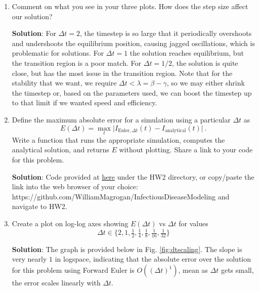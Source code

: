 \documentclass[11pt]{article}
\begin{document}
\begin{enumerate}
\begin{enumerate}[label=\alph*.]
	\item Comment on what you see in your three plots. How does the step size affect our solution?
	\begin{tcolorbox}
		\textbf{Solution}: For $\Delta t = 2$, the timestep is so large that it periodically overshoots and undershoots the equilibrium position, causing jagged oscillations, which is problematic for solutions. For $\Delta t =1$ the solution reaches equilibrium, but the transition region is a poor match. For $\Delta t=1/2$, the solution is quite close, but has the most issue in the transition region. Note that for the stability that we want, we require $\Delta t < \lambda = \beta-\gamma$, so we may either shrink the timestep or, based on the parameters used, we can boost the timestep up to that limit if we wanted speed and efficiency.
	\end{tcolorbox}
	\item Define the maximum absolute error for a simulation using a particular $\Delta t$ as $$E(\Delta t) = \max_{t} \big | I_{\text{Euler}, \Delta t} (t) - I_\text{analytical}(t) \big |\ .$$ Write a function that runs the appropriate simulation, computes the analytical solution, and returns $E$ without plotting. Share a link to your code for this problem.
	\begin{tcolorbox}
		\textbf{Solution}: Code provided at \href{https://github.com/WilliamMagrogan/InfectiousDiseaseModeling}{here} under the HW2 directory, or copy/paste the link into the web browser of your choice: https://github.com/WilliamMagrogan/InfectiousDiseaseModeling and navigate to HW2.
	\end{tcolorbox}
	\item Create a plot on log-log axes showing $E(\Delta t)$ vs $\Delta t$ for values $$\Delta t \in \{2,1,\tfrac{1}{2},\tfrac{1}{4},\tfrac{1}{8},\tfrac{1}{16},\tfrac{1}{32}\}$$
	\begin{tcolorbox}
		\textbf{Solution}: The graph is provided below in Fig. \ref{fig:dtscaling}. The slope is very nearly $1$ in logspace, indicating that the absolute error over the solution for this problem using Forward Euler is $O((\Delta t)^1)$, mean as $\Delta t$ gets small, the error scales linearly with $\Delta t$.
	\end{tcolorbox}
	\begin{figure}[H]
		\centering

\end{figure}
\end{enumerate}
\end{enumerate}
\end{document}
